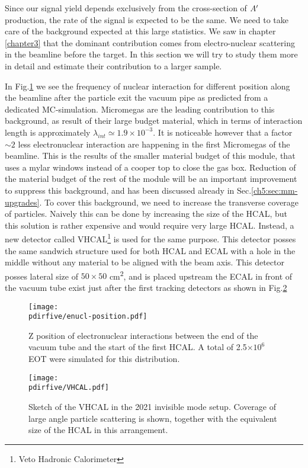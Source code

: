 Since our signal yield depends exclusively from the cross-section of $A'$ production, the rate of the signal is expected to be the same. We need to take care of the background expected at this large statistics. We saw in chapter \ref{chapter3} that the dominant contribution comes from electro-nuclear scattering in the beamline before the target. In this section we will try to study them more in detail and estimate their contribution to a larger sample.

In Fig.\ref{fig:enucl-position} we see the frequency of nuclear interaction for different position along the beamline after the particle exit the vacuum pipe as predicted from a dedicated MC-simulation. Micromegas are the leading contribution to this background, as result of their large budget material, which in terms of interaction length is approximately $\lambda_{int} \simeq 1.9 \times 10^{-3}$. It is noticeable however that a factor $\sim 2$ less electronuclear interaction are happening in the first Micromegas of the beamline. This is the results of the smaller material budget of this module, that uses a mylar windows instead of a cooper top to close the gas box. Reduction of the material budget of the rest of the module will be an important improvement to suppress this background, and has been discussed already in Sec.\ref{ch5:sec:mm-upgrades}. To cover this background, we need to increase the transverse coverage of particles. Naively this can be done by increasing the size of the HCAL, but this solution is rather expensive and would require very large HCAL. Instead, a new detector called VHCAL\footnote{Veto Hadronic Calorimeter} is used for the same purpose. This detector posses the same sandwich structure used for both HCAL and ECAL with a hole in the middle without any material to be aligned with the beam axis. This detector posses lateral size of $50\times50$ \si{\centi\meter\squared}, and is placed upstream the ECAL in front of the vacuum tube exist just after the first tracking detectors as shown in Fig.\ref{fig:vhcal}

\begin{figure}[bth!]
  \centering
  \texttt{[image: \\pdirfive/enucl-position.pdf]}
  \caption[electronuclear interaction position]{Z position of electronuclear interactions between the end of the vacuum tube and the start of the first HCAL. A total of 2.5$\times 10^6$ EOT were simulated for this distribution.}
  \label{fig:enucl-position}
\end{figure}

\begin{figure}[bth!]
  \centering
  \texttt{[image: \\pdirfive/VHCAL.pdf]}
  \caption[Sketch of VHCAL in invisible mode setup 2021]{Sketch of the VHCAL in the 2021 invisible mode setup. Coverage of large angle particle scattering is shown, together with the equivalent size of the HCAL in this arrangement.}
  \label{fig:vhcal}
\end{figure}

